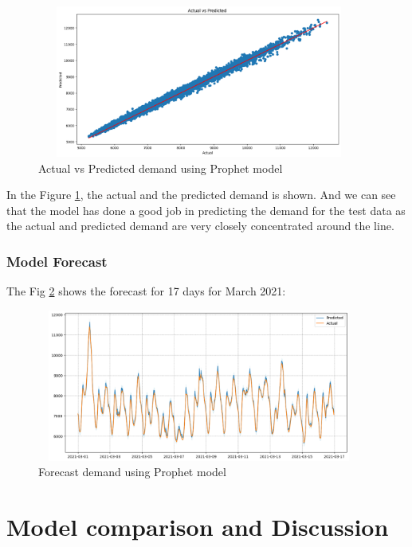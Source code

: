 \documentclass[mstat,12pt]{unswthesis}
\begin{document}
\begin{figure}[H]
\centering
\includegraphics[width=0.95\textwidth, height=5cm]{prophet_actual_predict.png}
\caption{Actual vs Predicted demand using Prophet model}\label{prophet_actual}
\end{figure}

In the Figure \ref{prophet_actual}, the actual and the predicted demand
is shown. And we can see that the model has done a good job in
predicting the demand for the test data as the actual and predicted
demand are very closely concentrated around the line.

\hypertarget{model-forecast}{%
\subsection{Model Forecast}\label{model-forecast}}

The Fig \ref{prophet_actual_predict_output} shows the forecast for 17
days for March 2021:

\begin{figure}[H]
\centering
\includegraphics[width=0.95\textwidth, height=5cm]{prophet_actual_predict_output.png}
\caption{Forecast demand using Prophet model}\label{prophet_actual_predict_output}
\end{figure}

\hypertarget{model-comparison-and-discussion}{%
\chapter{Model comparison and
Discussion}\label{model-comparison-and-discussion}}
\end{document}

